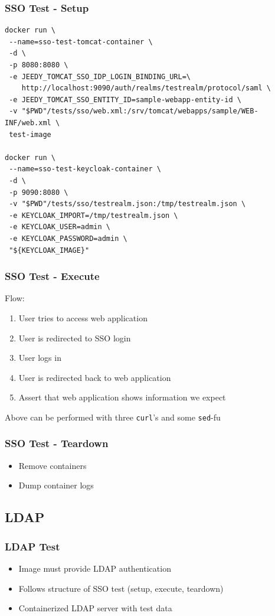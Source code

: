 \documentclass[14pt,aspectratio=169]{beamer}
\begin{document}
\begin{frame}[fragile]
  \frametitle{SSO Test - Setup}

  \begin{verbatim}
docker run \
 --name=sso-test-tomcat-container \
 -d \
 -p 8080:8080 \
 -e JEEDY_TOMCAT_SSO_IDP_LOGIN_BINDING_URL=\
    http://localhost:9090/auth/realms/testrealm/protocol/saml \
 -e JEEDY_TOMCAT_SSO_ENTITY_ID=sample-webapp-entity-id \
 -v "$PWD"/tests/sso/web.xml:/srv/tomcat/webapps/sample/WEB-INF/web.xml \
 test-image

docker run \
 --name=sso-test-keycloak-container \
 -d \
 -p 9090:8080 \
 -v "$PWD"/tests/sso/testrealm.json:/tmp/testrealm.json \
 -e KEYCLOAK_IMPORT=/tmp/testrealm.json \
 -e KEYCLOAK_USER=admin \
 -e KEYCLOAK_PASSWORD=admin \
 "${KEYCLOAK_IMAGE}"
  \end{verbatim}
\end{frame}

\begin{frame}
  \frametitle{SSO Test - Execute}
  Flow:
  \begin{enumerate}
    \item User tries to access web application
    \item User is redirected to SSO login
    \item User logs in
    \item User is redirected back to web application
    \item Assert that web application shows information we expect
  \end{enumerate}
  \hfill\break %
  Above can be performed with three \texttt{curl}'s and some \texttt{sed}-fu
\end{frame}

\begin{frame}
  \frametitle{SSO Test - Teardown}
  \begin{itemize}
    \item Remove containers
    \item Dump container logs
  \end{itemize}
\end{frame}

\subsection{LDAP}

\begin{frame}
  \frametitle{LDAP Test}
  \begin{itemize}
    \item Image must provide LDAP authentication
    \item Follows structure of SSO test (setup, execute, teardown)
    \item Containerized LDAP server with test data
  \end{itemize}
\end{frame}
\end{document}

